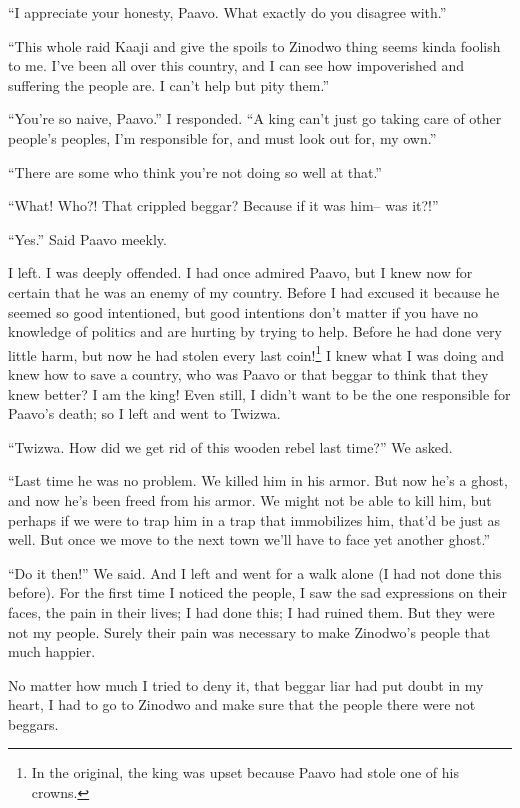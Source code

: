 ``I appreciate your honesty, Paavo. What exactly do you disagree with.''

``This whole raid Kaaji and give the spoils to Zinodwo thing seems kinda foolish to me. I've been all over this country, and I can see how impoverished and suffering the people are. I can't help but pity them.''

``You're so naive, Paavo.'' I responded. ``A king can't just go taking care of other people's peoples, I'm responsible for, and must look out for, my own.''

``There are some who think you're not doing so well at that.''

``What! Who?! That crippled beggar? Because if it was him-- was it?!''

``Yes.'' Said Paavo meekly.

I left. I was deeply offended. I had once admired Paavo, but I knew now for certain that he was an enemy of my country. Before I had excused it because he seemed so good intentioned, but good intentions don't matter if you have no knowledge of politics and are hurting by trying to help. Before he had done very little harm, but now he had stolen every last coin!\footnote{In the original, the king was upset because Paavo had stole one of his crowns.} I knew what I was doing and knew how to save a country, who was Paavo or that beggar to think that they knew better? I am the king! Even still, I didn't want to be the one responsible for Paavo's death; so I left and went to Twizwa.

``Twizwa. How did we get rid of this wooden rebel last time?'' We asked.

``Last time he was no problem. We killed him in his armor. But now he's a ghost, and now he's been freed from his armor. We might not be able to kill him, but perhaps if we were to trap him in a trap that immobilizes him, that'd be just as well. But once we move to the next town we'll have to face yet another ghost.''

``Do it then!'' We said. And I left and went for a walk alone (I had not done this before). For the first time I noticed the people, I saw the sad expressions on their faces, the pain in their lives; I had done this; I had ruined them. But they were not my people. Surely their pain was necessary to make Zinodwo's people that much happier.

No matter how much I tried to deny it, that beggar liar had put doubt in my heart, I had to go to Zinodwo and make sure that the people there were not beggars.


